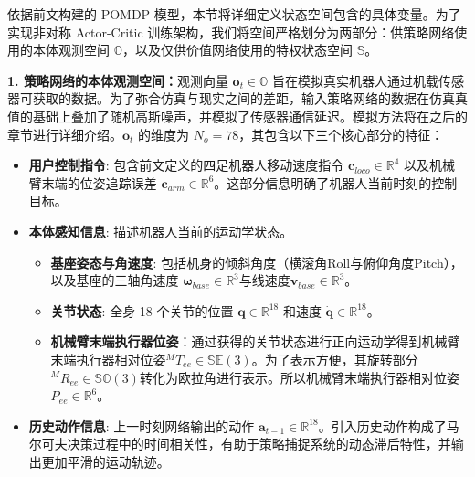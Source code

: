 依据前文构建的 POMDP 模型，本节将详细定义状态空间包含的具体变量。为了实现非对称 Actor-Critic 训练架构，我们将空间严格划分为两部分：供策略网络使用的本体观测空间 $\mathbb{O}$，以及仅供价值网络使用的特权状态空间 $\mathbb{S}$。

\textbf{1. 策略网络的本体观测空间：}观测向量 $\mathbf{o}_t \in \mathbb{O}$ 旨在模拟真实机器人通过机载传感器可获取的数据。为了弥合仿真与现实之间的差距，输入策略网络的数据在仿真真值的基础上叠加了随机高斯噪声，并模拟了传感器通信延迟。模拟方法将在之后的章节进行详细介绍。$\mathbf{o}_t$ 的维度为 $N_o=78$，其包含以下三个核心部分的特征：
\begin{itemize}
    \item \textbf{用户控制指令}: 包含前文定义的四足机器人移动速度指令 $\mathbf{c}_{loco}\in \mathbb{R}^4$ 以及机械臂末端的位姿追踪误差 $\mathbf{c}_{arm} \in \mathbb{R}^6$。这部分信息明确了机器人当前时刻的控制目标。
    \item \textbf{本体感知信息}: 描述机器人当前的运动学状态。
          \begin{itemize}
              \item \textbf{基座姿态与角速度}: 包括机身的倾斜角度（横滚角Roll与俯仰角度Pitch），以及基座的三轴角速度 $\boldsymbol{\omega}_{base} \in \mathbb{R}^3$与线速度$\mathbf{v}_{base} \in \mathbb{R}^3$。
              \item \textbf{关节状态}: 全身 18 个关节的位置 $\mathbf{q} \in \mathbb{R}^{18}$ 和速度 $\dot{\mathbf{q}} \in \mathbb{R}^{18}$。
              \item \textbf{机械臂末端执行器位姿}：通过获得的关节状态进行正向运动学得到机械臂末端执行器相对位姿$^MT_{ee}\in\mathbb{SE}(3)$。为了表示方便，其旋转部分$^MR_{ee}\in\mathbb{SO}(3)$转化为欧拉角进行表示。所以机械臂末端执行器相对位姿$P_{ee}\in \mathbb{R}^6$。
          \end{itemize}
    \item \textbf{历史动作信息}: 上一时刻网络输出的动作 $\mathbf{a}_{t-1} \in \mathbb{R}^{18}$。引入历史动作构成了马尔可夫决策过程中的时间相关性，有助于策略捕捉系统的动态滞后特性，并输出更加平滑的运动轨迹。
\end{itemize}

